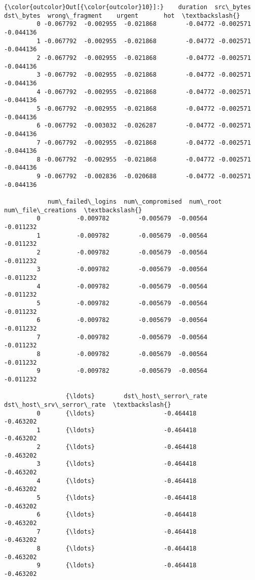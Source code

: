 \documentclass[11pt]{article}
\begin{document}
\begin{Verbatim}[commandchars=\\\{\}]
{\color{outcolor}Out[{\color{outcolor}10}]:}    duration  src\_bytes  dst\_bytes  wrong\_fragment    urgent       hot  \textbackslash{}
         0 -0.067792  -0.002955  -0.021868        -0.04772 -0.002571 -0.044136   
         1 -0.067792  -0.002955  -0.021868        -0.04772 -0.002571 -0.044136   
         2 -0.067792  -0.002955  -0.021868        -0.04772 -0.002571 -0.044136   
         3 -0.067792  -0.002955  -0.021868        -0.04772 -0.002571 -0.044136   
         4 -0.067792  -0.002955  -0.021868        -0.04772 -0.002571 -0.044136   
         5 -0.067792  -0.002955  -0.021868        -0.04772 -0.002571 -0.044136   
         6 -0.067792  -0.003032  -0.026287        -0.04772 -0.002571 -0.044136   
         7 -0.067792  -0.002955  -0.021868        -0.04772 -0.002571 -0.044136   
         8 -0.067792  -0.002955  -0.021868        -0.04772 -0.002571 -0.044136   
         9 -0.067792  -0.002836  -0.020688        -0.04772 -0.002571 -0.044136   
         
            num\_failed\_logins  num\_compromised  num\_root  num\_file\_creations  \textbackslash{}
         0          -0.009782        -0.005679  -0.00564           -0.011232   
         1          -0.009782        -0.005679  -0.00564           -0.011232   
         2          -0.009782        -0.005679  -0.00564           -0.011232   
         3          -0.009782        -0.005679  -0.00564           -0.011232   
         4          -0.009782        -0.005679  -0.00564           -0.011232   
         5          -0.009782        -0.005679  -0.00564           -0.011232   
         6          -0.009782        -0.005679  -0.00564           -0.011232   
         7          -0.009782        -0.005679  -0.00564           -0.011232   
         8          -0.009782        -0.005679  -0.00564           -0.011232   
         9          -0.009782        -0.005679  -0.00564           -0.011232   
         
                 {\ldots}        dst\_host\_serror\_rate  dst\_host\_srv\_serror\_rate  \textbackslash{}
         0       {\ldots}                   -0.464418                 -0.463202   
         1       {\ldots}                   -0.464418                 -0.463202   
         2       {\ldots}                   -0.464418                 -0.463202   
         3       {\ldots}                   -0.464418                 -0.463202   
         4       {\ldots}                   -0.464418                 -0.463202   
         5       {\ldots}                   -0.464418                 -0.463202   
         6       {\ldots}                   -0.464418                 -0.463202   
         7       {\ldots}                   -0.464418                 -0.463202   
         8       {\ldots}                   -0.464418                 -0.463202   
         9       {\ldots}                   -0.464418                 -0.463202   
         

\end{Verbatim}
\end{document}
